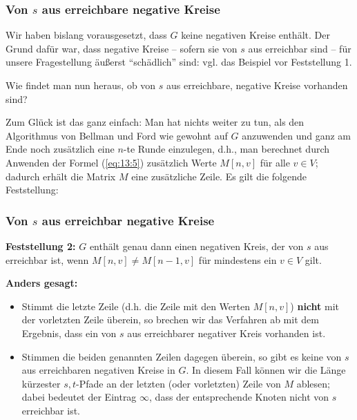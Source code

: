 \documentclass[smaller,xcolor=dvipsnames]{beamer}
\begin{document}
\begin{frame}
\frametitle{Von $s$ aus erreichbare negative Kreise}
 Wir haben bislang vorausgesetzt, dass $G$ keine negativen Kreise enthält. Der Grund dafür war, dass negative Kreise -- sofern sie von $s$ aus erreichbar sind -- für unsere Fragestellung äußerst \enquote{schädlich} sind: vgl. das Beispiel vor Feststellung 1. \\ \medskip

\alert{Wie findet man nun heraus, ob von $s$ aus erreichbare, negative Kreise vorhanden sind?} \\ \medskip

\alert{Zum Glück ist das ganz einfach:} Man hat nichts weiter zu tun, als den Algorithmus von Bellman und Ford wie gewohnt auf $G$ anzuwenden und ganz am Ende noch zusätzlich eine $n$-te Runde einzulegen, d.h., man berechnet durch Anwenden der Formel (\ref{eq:13:5}) zusätzlich Werte $M[n,v]$ für alle $v \in V$; dadurch erhält die Matrix $M$ eine zusätzliche Zeile. Es gilt die folgende Feststellung:
\end{frame}

\begin{frame}
\frametitle{Von $s$ aus erreichbar negative Kreise}
\textbf{Feststellung 2:} $G$ enthält genau dann einen negativen Kreis, der von $s$ aus erreichbar ist, wenn $M[n,v] \neq M[n-1,v]$ für mindestens ein $v \in V$ gilt. \\ \medskip

\textbf{Anders gesagt:}
\begin{itemize}
\item Stimmt die letzte Zeile (d.h. die Zeile mit den Werten $M[n,v]$) \textbf{nicht} mit der vorletzten Zeile überein, \alert{so brechen wir das Verfahren ab} mit dem Ergebnis, dass ein von $s$ aus erreichbarer negativer Kreis vorhanden ist.

\item Stimmen die beiden genannten Zeilen dagegen überein, so gibt es keine von $s$ aus erreichbaren negativen Kreise in $G$. \alert{In diesem Fall können wir die Länge kürzester $s,t$-Pfade an der letzten (oder vorletzten) Zeile von $M$ ablesen;} dabei bedeutet der Eintrag $\infty$, dass der entsprechende Knoten nicht von $s$ erreichbar ist.
\end{itemize}
\end{frame}
\end{document}
